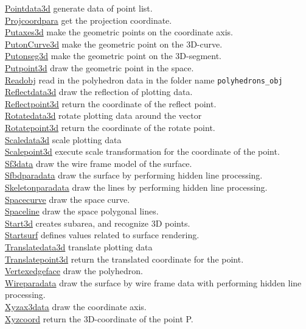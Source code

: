 \documentclass[papersize,a4paper,12pt]{article}
\begin{document}
\begin{tabbing}
\hyperlink{pointdata3d}{Pointdata3d} \> generate data of point list.\\
\hyperlink{projcoordpara}{Projcoordpara} \> get the projection coordinate.\\
\hyperlink{putaxes3d}{Putaxes3d} \> make the geometric points on the coordinate axis. \\
\hyperlink{putonCurve3d}{PutonCurve3d} \> make the geometric point on the 3D-curve.\\
\hyperlink{putonseg3d}{Putonseg3d} \> make the geometric point on the 3D-segment.\\
\hyperlink{putpoint3d}{Putpoint3d} \> draw the geometric point in the space.\\
\hyperlink{readobj}{Readobj} \> read in the polyhedron data in the folder name \verb|polyhedrons_obj|\\
\hyperlink{reflectdata3d}{Reflectdata3d} \> draw the reflection of plotting data.\\
\hyperlink{reflectpoint3d}{Reflectpoint3d} \> return the coordinate of the reflect point.\\
\hyperlink{rotatedata3d}{Rotatedata3d} \> rotate plotting data around the vector\\
\hyperlink{rotatepoint3d}{Rotatepoint3d} \> return the coordinate of the rotate point.\\
\hyperlink{scaledata3d}{Scaledata3d} \>scale plotting data \\
\hyperlink{scalepoint3d}{Scalepoint3d} \> execute scale transformation for the coordinate of the point.\\
\hyperlink{sf3data}{Sf3data} \> draw the wire frame model of the surface.\\
\hyperlink{sfbdparadata}{Sfbdparadata} \> draw the surface by performing hidden line processing.\\
\hyperlink{skeletonparadata}{Skeletonparadata} \> draw the lines by performing hidden line processing.\\
\hyperlink{spacecurve}{Spacecurve} \> draw the space curve.\\
\hyperlink{spaceline}{Spaceline} \> draw the space polygonal lines.\\
\hyperlink{start3d}{Start3d} \> creates subarea, and recognize 3D points.\\
\hyperlink{startsurf}{Startsurf} \> defines values related to surface rendering.\\
\hyperlink{translatedata3d}{Translatedata3d} \> translate plotting data\\
\hyperlink{translatepoint3d}{Translatepoint3d} \> return the translated coordinate for the point.\\\hyperlink{vertexedgeface}{Vertexedgeface} \> draw the polyhedron.\\
\hyperlink{wireparadata}{Wireparadata} \> draw the surface by wire frame data with performing hidden line processing.\\
\hyperlink{xyzax3data}{Xyzax3data} \> draw the coordinate axis.\\
\hyperlink{xyzcoord}{Xyzcoord} \> return the 3D-coordinate of the point P.\\

\end{tabbing}
\end{document}
